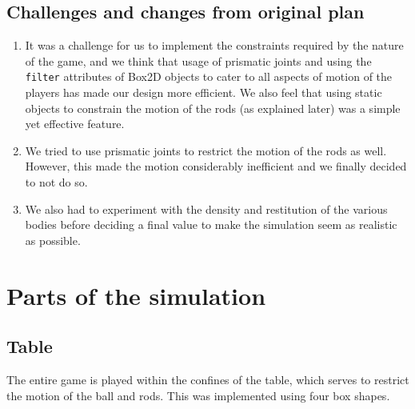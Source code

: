 \documentclass{article}
\begin{document}
\subsection{Challenges and changes from original plan}
\begin{enumerate}
\item It was a challenge for us to implement the constraints required by the nature of the game, and we think that usage of prismatic joints and using the \texttt{filter} attributes of Box2D objects to cater to all aspects of motion of the players has made our design more efficient. We also feel that using static objects to constrain the motion of the rods (as explained later) was a simple yet effective feature.\\
\item We tried to use prismatic joints to restrict the motion of the rods as well. However, this made the motion considerably inefficient and we finally decided to not do so.
\item We also had to experiment with the density and restitution of the various bodies before deciding a final value to make the simulation seem as realistic as possible.
\end{enumerate}

\section{Parts of the simulation}

\subsection{Table}
The entire game is played within the confines of the table, which serves to restrict the motion of the ball and rods. This was implemented using four box shapes.\\
\end{document}
